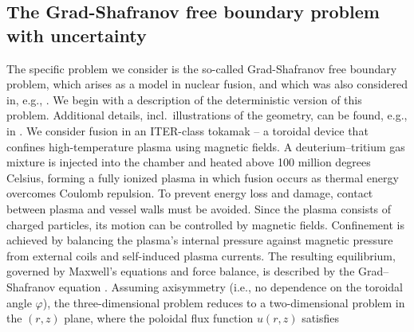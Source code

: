 \subsection{The Grad-Shafranov free boundary problem with uncertainty}\label{sec:Grad-Shafranov}
The specific problem we consider is the so-called Grad-Shafranov free boundary problem, which arises as a model in nuclear fusion, and which was also considered
in, e.g., \cite{HCElman_JLiang_TSanchez-Vizuet_2022a}.
We begin with a description of the deterministic version of this problem. Additional details, incl.\ illustrations of the geometry, can be found, e.g., in \cite{HCElman_JLiang_TSanchez-Vizuet_2022a}.
We consider fusion in an ITER-class tokamak -- a toroidal device that confines high-temperature plasma using magnetic fields. 
A deuterium–tritium gas mixture is injected into the chamber and heated above 100 million degrees Celsius, forming a fully ionized plasma in which fusion occurs as thermal energy overcomes Coulomb repulsion. To prevent energy loss and damage, contact between plasma and vessel walls must be avoided. Since the plasma consists of charged particles, its motion can be controlled by magnetic fields. Confinement is achieved by balancing the plasma’s internal pressure against magnetic pressure from external coils and self-induced plasma currents. The resulting equilibrium, governed by Maxwell’s equations and force balance, is described by the Grad–Shafranov equation \cite{GrRu:1958, LuSc:1957, Shafranov:1958}. Assuming axisymmetry (i.e., no dependence on the toroidal angle $\varphi$), the three-dimensional problem reduces to a two-dimensional problem in the $(r, z)$ plane, where the poloidal flux function $u(r,z)$ satisfies
%
